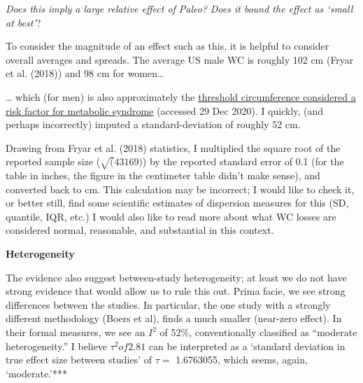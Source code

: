 \documentclass[]{tufte-handout}
\begin{document}
\hfill\break

\emph{Does this imply a large relative effect of Paleo?} \emph{Does it
bound the effect as `small at best'}?

To consider the magnitude of an effect such as this, it is helpful to
consider overall averages and spreads. The average US male WC is roughly
102 cm (Fryar et al. (2018)) and 98 cm for women\ldots{}\\

\ldots{} which (for men) is also approximately the
\href{https://www.heart.org/en/health-topics/metabolic-syndrome/about-metabolic-syndrome}{threshold
circumference considered a risk factor for metabolic syndrome} (accessed
29 Dec 2020). I quickly, (and perhaps incorrectly) imputed a
standard-deviation of roughly 52 cm.

Drawing from Fryar et al. (2018) statistics, I multiplied the square
root of the reported sample size (\(\sqrt(43169)\)) by the reported
standard error of 0.1 (for the table in inches, the figure in the
centimeter table didn't make sense), and converted back to cm. This
calculation may be incorrect; I would like to check it, or better still,
find some scientific estimates of dispersion measures for this (SD,
quantile, IQR, etc.) I would also like to read more about what WC losses
are considered normal, reasonable, and substantial in this context.

\hfill\break

\textbf{Heterogeneity}

The evidence also suggest between-study heterogeneity; at least we do
not have strong evidence that would allow us to rule this out. Prima
facie, we see strong differences between the studies. In particular, the
one study with a strongly different methodology (Boers et al), finds a
much smaller (near-zero effect). In their formal measures, we see an
\(I^2\) of 52\%, conventionally classified as ``moderate
heterogeneity.'' I believe \(\tau^2 of 2.81\) can be interpreted as a
`standard deviation in true effect size between studies' of \(\tau =\)
1.6763055, which seems, again, `moderate.'***

\end{document}
